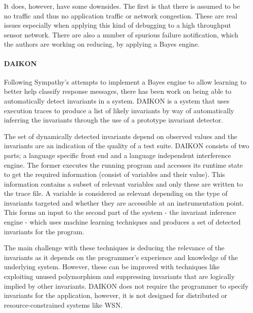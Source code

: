 It does, however, have some downsides. The first is that there is assumed to be no traffic and thus no application traffic or network congestion. These are real issues especially when applying this kind of debugging to a high throughput sensor network. There are also a number of spurious failure notification, which the authors are working on reducing, by applying a Bayes engine.

\paragraph{DAIKON} Following Sympathy's attempts to implement a Bayes engine to allow learning to better help classify response messages, there has been work on being able to automatically detect invariants in a system. DAIKON \cite{DAIKON} is a system that uses execution traces to produce a list of likely invariants by way of automatically inferring the invariants through the use of a prototype invariant detector.

The set of dynamically detected invariants depend on observed values and the invariants are an indication of the quality of a test suite. DAIKON consists of two parts; a language specific front end and a language independent interference engine. The former executes the running program and accesses its runtime state to get the required information (consist of variables and their value). This information contains a subset of relevant variables and only these are written to the trace file. A variable is considered as relevant depending on the type of invariants targeted and whether they are accessible at an instrumentation point. This forms an input to the second part of the system - the invariant inference engine - which uses machine learning techniques and produces a set of detected invariants for the program.

The main challenge with these techniques is deducing the relevance of the invariants as it depends on the programmer's experience and knowledge of the underlying system. However, these can be improved with techniques like exploiting unused polymorphism and suppressing invariants that are logically implied by other invariants. DAIKON does not require the programmer to specify invariants for the application, however, it is not designed for distributed or resource-constrained systems like WSN.

